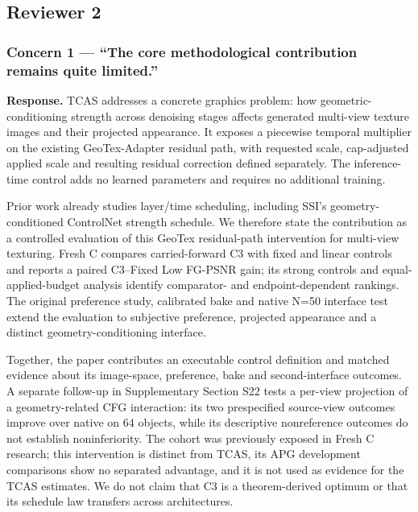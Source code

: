 \documentclass[
]{article}
\begin{document}
\hypertarget{reviewer-2}{%
\subsection{Reviewer 2}\label{reviewer-2}}

\hypertarget{concern-1-the-core-methodological-contribution-remains-quite-limited.}{%
\subsubsection{Concern 1 --- ``The core methodological contribution
remains quite
limited.''}\label{concern-1-the-core-methodological-contribution-remains-quite-limited.}}

\textbf{Response.} TCAS addresses a concrete graphics problem: how
geometric-conditioning strength across denoising stages affects
generated multi-view texture images and their projected appearance. It
exposes a piecewise temporal multiplier on the existing GeoTex-Adapter
residual path, with requested scale, cap-adjusted applied scale and
resulting residual correction defined separately. The inference-time
control adds no learned parameters and requires no additional training.

Prior work already studies layer/time scheduling, including SSI's
geometry-conditioned ControlNet strength schedule. We therefore state
the contribution as a controlled evaluation of this GeoTex residual-path
intervention for multi-view texturing. Fresh C compares carried-forward
C3 with fixed and linear controls and reports a paired C3--Fixed Low
FG-PSNR gain; its strong controls and equal-applied-budget analysis
identify comparator- and endpoint-dependent rankings. The original
preference study, calibrated bake and native N=50 interface test extend
the evaluation to subjective preference, projected appearance and a
distinct geometry-conditioning interface.

Together, the paper contributes an executable control definition and
matched evidence about its image-space, preference, bake and
second-interface outcomes. A separate follow-up in Supplementary Section
S22 tests a per-view projection of a geometry-related CFG interaction:
its two prespecified source-view outcomes improve over native on 64
objects, while its descriptive nonreference outcomes do not establish
noninferiority. The cohort was previously exposed in Fresh C research;
this intervention is distinct from TCAS, its APG development comparisons
show no separated advantage, and it is not used as evidence for the TCAS
estimates. We do not claim that C3 is a theorem-derived optimum or that
its schedule law transfers across architectures.
\end{document}
